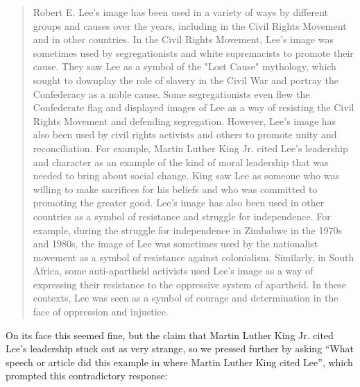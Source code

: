 \documentclass[letterpaper, 10pt, conference]{ieeeconf}
\begin{document}
    \begin{quote}
        
    Robert E. Lee's image has been used in a variety of ways by different groups and causes over the years, including in the
    Civil Rights Movement and in other countries. In the Civil Rights Movement, Lee's image was sometimes used by
    segregationists and white supremacists to promote their cause. They saw Lee as a symbol of the "Lost Cause" mythology,
    which sought to downplay the role of slavery in the Civil War and portray the Confederacy as a noble cause. Some
    segregationists even flew the Confederate flag and displayed images of Lee as a way of resisting the Civil Rights
    Movement and defending segregation. However, Lee's image has also been used by civil rights activists and others to
    promote unity and reconciliation. For example, Martin Luther King Jr. cited Lee's leadership and character as an
    example of the kind of moral leadership that was needed to bring about social change. King saw Lee as someone who
    was willing to make sacrifices for his beliefs and who was committed to promoting the greater good. Lee's image has
    also been used in other countries as a symbol of resistance and struggle for independence. For example, during the
    struggle for independence in Zimbabwe in the 1970s and 1980s, the image of Lee was sometimes used by the nationalist
    movement as a symbol of resistance against colonialism. Similarly, in South Africa, some anti-apartheid activists used
    Lee's image as a way of expressing their resistance to the oppressive system of apartheid. In these contexts, Lee was seen
    as a symbol of courage and determination in the face of oppression and injustice.
    \end{quote}
    On its face this seemed fine, but the claim that Martin Luther King Jr. cited Lee’s leadership stuck out as very strange, so we
    pressed further by asking “What speech or article did this example in where Martin Luther King cited Lee”, which prompted this
    contradictory response:
\end{document}
